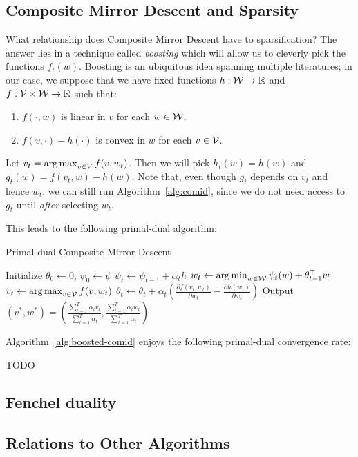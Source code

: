 \documentclass[paper.tex]{subfiles}
\begin{document}
\subsection{Composite Mirror Descent and Sparsity}
\label{sec:boosted}
What relationship does Composite Mirror Descent have to sparsification? The answer lies
in a technique called \emph{boosting} which will allow us to cleverly pick the functions 
$f_t(w)$. Boosting is an ubiquitous idea spanning multiple literatures; %
in our case, we suppose that we have fixed functions $h : \mathcal{W} \to \mathbb{R}$ and 
$f : \mathcal{V} \times \mathcal{W} \to \mathbb{R}$ such that:
\begin{enumerate}
\item $f(\cdot, w)$ is linear in $v$ for each $w \in \mathcal{W}$.
\item $f(v, \cdot) - h(\cdot)$ is convex in $w$ for each $v \in \mathcal{V}$.
\end{enumerate}
Let $v_t = \argmax_{v \in V} f(v, w_t)$. Then we will pick 
$h_t(w) = h(w)$ and $g_t(w) = f(v_t, w) - h(w)$. Note that, 
even though $g_t$ depends on $v_t$ and hence $w_t$, we can still 
run Algorithm~\ref{alg:comid}, since we do not need access to $g_t$ 
until \emph{after} selecting $w_t$. 

This leads to the following primal-dual algorithm:
\begin{algorithm}
\caption{Primal-dual Composite Mirror Descent}
\label{alg:boosted-comid}
\begin{algorithmic}
\STATE Initialize $\theta_0 \gets 0$, $\psi_0 \gets \psi$
  \STATE $\psi_t \gets \psi_{t-1} + \alpha_t h$
  \STATE $w_t \gets \argmin_{w \in \W} \psi_t(w) + \theta_{t-1}^{\top} w$
  \STATE $v_t \gets \argmax_{v \in \V} f(v, w_t)$
  \STATE $\theta_t \gets \theta_t + \alpha_t \left(\frac{\partial f(v_t, w_t)}{\partial w_t} - \frac{\partial h(w_t)}{\partial w_t}\right)$
\ENDFOR
\STATE Output $(v^*, w^*) = \left(\frac{\sum_{t=1}^T \alpha_t v_t}{\sum_{t=1}^T \alpha_t}, \frac{\sum_{t=1}^T \alpha_t w_t}{\sum_{t=1}^T \alpha_t}\right)$
\end{algorithmic}
\end{algorithm}

Algorithm~\ref{alg:boosted-comid} enjoys the following primal-dual convergence rate:
\begin{theorem}
TODO
\end{theorem}

\subsection{Fenchel duality}
\label{sec:fenchel}

\subsection{Relations to Other Algorithms}
\label{sec:derived}
\end{document}
